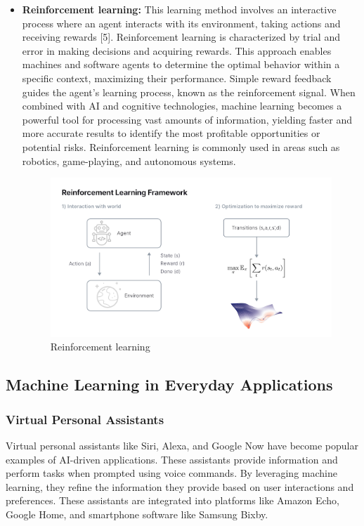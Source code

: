 \begin{itemize}
\item\textbf{Reinforcement learning:} This learning method involves an interactive process where an agent interacts with its environment, taking actions and receiving rewards [5]. Reinforcement learning is characterized by trial and error in making decisions and acquiring rewards. This approach enables machines and software agents to determine the optimal behavior within a specific context, maximizing their performance. Simple reward feedback guides the agent's learning process, known as the reinforcement signal. When combined with AI and cognitive technologies, machine learning becomes a powerful tool for processing vast amounts of information, yielding faster and more accurate results to identify the most profitable opportunities or potential risks. Reinforcement learning is commonly used in areas such as robotics, game-playing, and autonomous systems.
\begin{center}
    \begin{figure}[!htp]
        \centering
        \includegraphics[width=0.8 \textwidth]{image/reinforcement_learning.png}
        \caption{Reinforcement learning}
        \label{subsection}
    \end{figure}
\end{center}
\end{itemize}

\subsection{Machine Learning in Everyday Applications}
\subsubsection{Virtual Personal Assistants}
Virtual personal assistants like Siri, Alexa, and Google Now have become popular examples of AI-driven applications. These assistants provide information and perform tasks when prompted using voice commands. By leveraging machine learning, they refine the information they provide based on user interactions and preferences. 
These assistants are integrated into platforms like Amazon Echo, Google Home, and smartphone software like Samsung Bixby.
